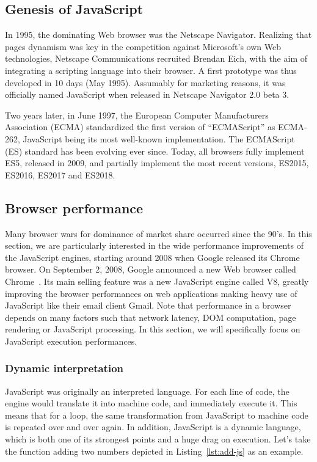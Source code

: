 \subsection{Genesis of JavaScript}%
\label{sub:genesis_of_javascript}

In 1995, the dominating Web browser was the Netscape Navigator.
Realizing that pages dynamism was key in the competition against Microsoft's
own Web technologies, Netscape Communications recruited Brendan Eich,
with the aim of integrating a scripting language into their browser.
A first prototype was thus developed in 10 days (May 1995).
Assumably for marketing reasons, it was officially named JavaScript
when released in Netscape Navigator 2.0 beta 3.

Two years later, in June 1997, the European Computer Manufacturers Association
(ECMA) standardized the first version of ``ECMAScript'' as ECMA-262,
JavaScript being its most well-known implementation.
The ECMAScript (ES) standard has been evolving ever since.
Today, all browsers fully implement ES5, released in 2009,
and partially implement the most recent versions, ES2015,
ES2016, ES2017 and ES2018.

\subsection{Browser performance}%
\label{sub:browser_performance}

Many browser wars for dominance of market share occurred since the 90's.
In this section, we are particularly interested
in the wide performance improvements of the JavaScript engines,
starting around 2008 when Google released its Chrome browser.
On September 2, 2008, Google announced a new Web browser called Chrome~\cite{google-chrome}.
Its main selling feature was a new JavaScript engine called V8,
greatly improving the browser performances on web applications making
heavy use of JavaScript like their email client Gmail.
Note that performance in a browser depends on many factors
such that network latency, DOM computation, page rendering or JavaScript processing.
In this section, we will specifically focus on JavaScript execution performances.

\subsubsection{Dynamic interpretation}%
\label{ssub:dynamic-interpretation}

JavaScript was originally an interpreted language.
For each line of code, the engine would translate it into machine code,
and immediately execute it.
This means that for a loop, the same transformation from JavaScript to machine code
is repeated over and over again.
In addition, JavaScript is a dynamic language, which is both one of its
strongest points and a huge drag on execution.
Let's take the function adding two numbers
depicted in Listing~\ref{lst:add-js} as an example.

